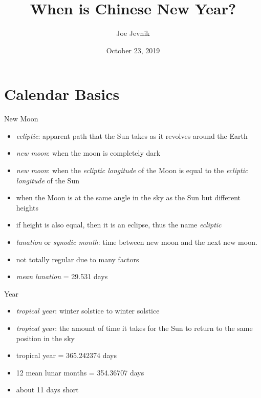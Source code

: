 \documentclass[table]{beamer}
\title{When is Chinese New Year?}
\date{October 23, 2019}
\author{Joe Jevnik}
\institute{Boston Python}
\begin{document}
\maketitle

\section{Calendar Basics}

\begin{frame}{New Moon}
  \begin{itemize}
  \item<+-> \textit{ecliptic}: apparent path that the Sun takes as it
    revolves around the Earth
  \item<+-> \textit{new moon}: when the moon is completely dark
  \item<+-> \textit{new moon}: when the \textit{ecliptic longitude} of the Moon is equal to
    the \textit{ecliptic longitude} of the Sun
  \item<+-> when the Moon is at the same angle in the sky as the Sun but
    different heights
  \item<+-> if height is also equal, then it is an eclipse, thus the name
    \textit{ecliptic}
  \item<+-> \textit{lunation} or \textit{synodic month}: time between new moon
    and the next new moon.
  \item<+-> not totally regular due to many factors
  \item<+-> \textit{mean lunation} = 29.531 days
  \end{itemize}
\end{frame}

\begin{frame}{Year}
  \begin{itemize}
  \item<+-> \textit{tropical year}: winter solstice to winter solstice
  \item<+-> \textit{tropical year}: the amount of time it takes for the Sun to
    return to the same position in the sky
  \item<+-> tropical year = 365.242374 days
  \item<+-> 12 mean lunar months = 354.36707 days
  \item<+-> about 11 days short
  \end{itemize}
\end{frame}
\end{document}
